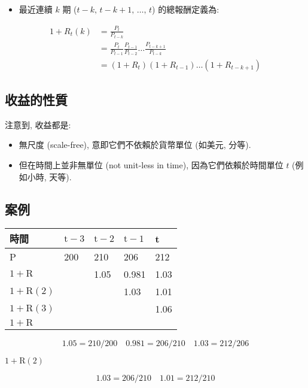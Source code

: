 \documentclass[letterpaper]{article}
\begin{document}
		\begin{itemize}
			\item 最近連續 $k$ 期 ($t-k, \, t-k+1, \, \ldots, \, t$) 的總報酬定義為: 
		\end{itemize}
		$$
		\begin{aligned}
			1+R_{t} (k) & =\frac{P_{t}}{P_{t-k}} \\
			& =\frac{P_{t}}{P_{t-1}} \frac{P_{t-1}}{P_{t-2}} \ldots \frac{P_{t-k+1}}{P_{t-k}} \\
			& =\left (1+R_{t}\right) \left (1+R_{t-1}\right) \ldots\left (1+R_{t-k+1}\right) 
		\end{aligned}
		$$
		
		\subsection{收益的性質}
		注意到, 收益都是: 
		
		\begin{itemize}
			\item 無尺度 (scale-free), 意即它們不依賴於貨幣單位 (如美元, 分等). 
			\item 但在時間上並非無單位 (not unit-less in time), 因為它們依賴於時間單位 $t$ (例如小時, 天等). 
		\end{itemize}
		
		\subsection{案例}
		\begin{center}
			\begin{tabular}{lllll}
				時間 & $\mathrm{t}-3$ & $\mathrm{t}-2$ & $\mathrm{t}-1$ & t \\
				\hline
				P & 200 & 210 & 206 & 212 \\
				$1+\mathrm{R}$ &  & 1.05 & 0.981 & 1.03 \\
				$1+\mathrm{R} (2) $ &  &  & 1.03 & 1.01 \\
				$1+\mathrm{R} (3) $ &  &  &  & 1.06 \\
				\hline
				$1+\mathrm{R}$ &  &  &  &  \\
				\hline
			\end{tabular}
		\end{center}
		
		$$
		1.05=210 / 200 \quad 0.981=206 / 210 \quad 1.03=212 / 206
		$$
		
		$1+\mathrm{R} (2) $
		
		$$
		1.03=206 / 210 \quad 1.01=212 / 210
		$$
		
\end{document}
